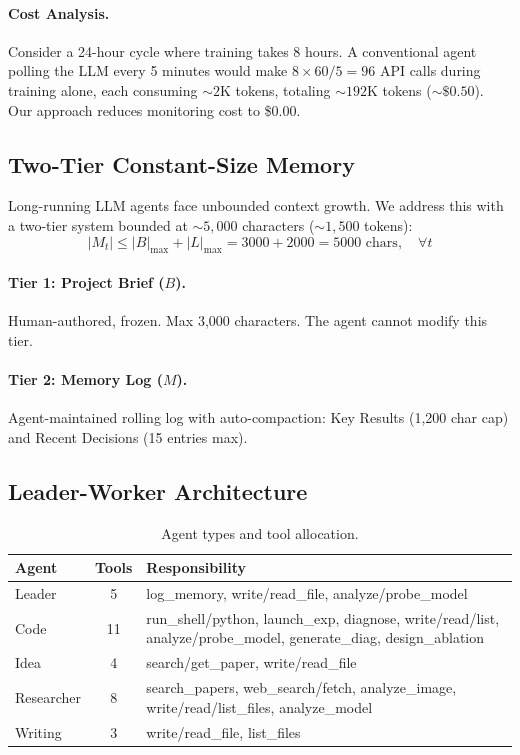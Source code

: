 \documentclass[11pt,a4paper]{article}
\begin{document}
\paragraph{Cost Analysis.}
Consider a 24-hour cycle where training takes 8 hours.
A conventional agent polling the LLM every 5 minutes would make $8 \times 60/5 = 96$ API calls during training alone, each consuming ${\sim}2$K tokens, totaling ${\sim}192$K tokens (${\sim}\$0.50$).
Our approach reduces monitoring cost to \$0.00.

\subsection{Two-Tier Constant-Size Memory}

Long-running LLM agents face unbounded context growth.
We address this with a two-tier system bounded at ${\sim}5{,}000$ characters (${\sim}1{,}500$ tokens):
\begin{equation}
|M_t| \leq |B|_{\max} + |L|_{\max} = 3000 + 2000 = 5000 \text{ chars}, \quad \forall t
\end{equation}

\paragraph{Tier 1: Project Brief ($B$).}
Human-authored, frozen. Max 3,000 characters. The agent cannot modify this tier.

\paragraph{Tier 2: Memory Log ($M$).}
Agent-maintained rolling log with auto-compaction: Key Results (1,200 char cap) and Recent Decisions (15 entries max).

\subsection{Leader-Worker Architecture}

\begin{table}[h]
\centering
\begin{threeparttable}
\caption{Agent types and tool allocation.}
\label{tab:agents}
\begin{tabularx}{\linewidth}{l c X}
\toprule
\textbf{Agent} & \textbf{Tools} & \textbf{Responsibility} \\
\midrule
Leader     & 5  & log\_memory, write/read\_file, analyze/probe\_model \\
Code       & 11 & run\_shell/python, launch\_exp, diagnose, write/read/list, analyze/probe\_model, generate\_diag, design\_ablation \\
Idea       & 4  & search/get\_paper, write/read\_file \\
Researcher & 8  & search\_papers, web\_search/fetch, analyze\_image, write/read/list\_files, analyze\_model \\
Writing    & 3  & write/read\_file, list\_files \\
\bottomrule
\end{tabularx}
\end{threeparttable}
\end{table}
\end{document}
